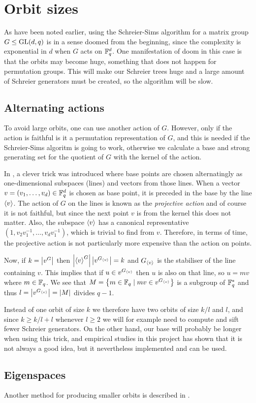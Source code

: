 \section{Orbit sizes}
As have been noted earlier, using the Schreier-Sims algorithm for a
matrix group $G \leq \operatorname{GL}(d, q)$ is in a sense doomed from the
beginning, since the complexity is exponential in $d$ when $G$ acts on
$\mathbb{F}_q^d$. One manifestation of doom in this case is that the orbits
may become huge, something that does not happen for permutation
groups. This will make our Schreier trees huge and a large amount of Schreier generators must be created, so the algorithm will be slow.

\subsection{Alternating actions}
To avoid large orbits, one can use another action of $G$. However,
only if the action is faithful is it a permutation representation of
$G$, and this is needed if the Schreier-Sims algoritm is going to
work, otherwise we calculate a base and strong generating set for the quotient of $G$ with the kernel of the action.

In \cite{butler76}, a clever trick was introduced where base points are
chosen alternatingly as one-dimensional subspaces (lines) and vectors
from those lines. When a vector $v = (v_1, \dotsc, v_d) \in \mathbb{F}_q^d$ is
chosen as base point, it is preceded in the base by the line
$\left\langle v \right\rangle$. The action of $G$ on the lines is known as the
\emph{projective action} and of course it is not faithful, but since the next
point $v$ is from the kernel this does not matter. Also, the subspace
$\left\langle v \right\rangle$ has a canonical representative $(1, v_2 v_1^{-1}, \dotsc,
v_d v_1^{-1})$, which is trivial to find from $v$. Therefore, in terms
of time, the projective action is not particularly more expensive than the action on points.

Now, if $k = \left\lvert v^G \right\rvert$ then $\left\lvert \left\langle v \right\rangle^G \right\rvert \left\lvert v^{G_{\left\langle v \right\rangle}} \right\rvert = k$ and $G_{\left\langle v \right\rangle}$
is the stabiliser of the line containing $v$. This implies that if $u \in
v^{G_{\left\langle v \right\rangle}}$ then $u$ is also on that line, so $u = mv$ where $m
\in \mathbb{F}_q$. We see that $M = \left\lbrace m \in \mathbb{F}_q \mid mv \in v^{G_{\left\langle v \right\rangle}} \right\rbrace$ is a
subgroup of $\mathbb{F}_q^{*}$ and thus $l = \left\lvert v^{G_{\left\langle v \right\rangle}} \right\rvert = \left\lvert M \right\rvert$ divides $q - 1$.

Instead of one orbit of size $k$ we therefore have two orbits of size
$k/l$ and $l$, and since $k \geq k/l + l$ whenever $l \geq 2$ we will for
example need to compute and sift fewer Schreier generators. On the
other hand, our base will probably be longer when using this trick,
and empirical studies in this project has shown that it is not always
a good idea, but it nevertheless implemented and can be used.

\subsection{Eigenspaces}
Another method for producing smaller orbits is described in \cite{murray95}.